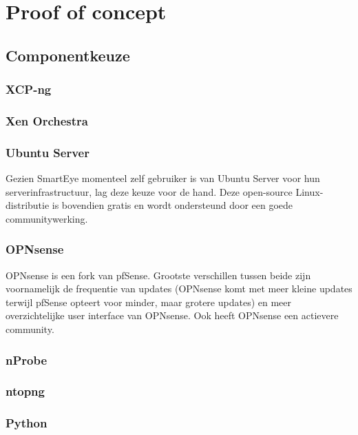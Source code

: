 \chapter{Proof of concept}

\section{Componentkeuze}


\subsection{XCP-ng}

\subsection{Xen Orchestra}

\subsection{Ubuntu Server}
Gezien SmartEye momenteel zelf gebruiker is van Ubuntu Server voor hun serverinfrastructuur, lag deze keuze voor de hand. Deze open-source Linux-distributie is bovendien gratis en wordt ondersteund door een goede communitywerking.

\subsection{OPNsense}
OPNsense is een fork van pfSense. Grootste verschillen tussen beide zijn voornamelijk de frequentie van updates (OPNsense komt met meer kleine updates terwijl pfSense opteert voor minder, maar grotere updates) en meer overzichtelijke user interface van OPNsense. Ook heeft OPNsense een actievere community.

\subsection{nProbe}

\subsection{ntopng}

\subsection{Python}

